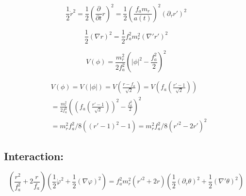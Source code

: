 \documentclass[a4paper]{article}
\begin{document}
\begin{equation}
    \frac{1}{2} \dot{r}^2 = \frac{1}{2} (\frac{\partial}{\partial t} r)^2
    = \frac{1}{2} (\frac{f_a m_r}{a(t)})^2 \left( \partial_\tau r' \right)^2
\end{equation}

\begin{equation}
    \frac{1}{2} (\nabla r)^2 = \frac{1}{2} f_a^2 m_r^2 ( \nabla' r')^2
\end{equation}

\begin{equation}
    V(\phi) = \frac{m_r^2}{2 f_a^2}\left( |\phi|^2 - \frac{f_a^2}{2} \right)^2
\end{equation}

\begin{align}
    &V(\phi) = V(|\phi|) = V(\frac{r - f_a}{\sqrt{2}})
    = V \left(f_a \left( \frac{r' - 1}{\sqrt{2}} \right) \right) \\
    &= \frac{m_r^2}{2 f_a^2}\left( \left(f_a \left( \frac{r' - 1}{\sqrt{2}} \right) \right)^2 - \frac{f_a^2}{2} \right)^2 \\
    &= m_r^2 f_a^2 / 8 ( (r' - 1)^2 - 1)
    = m_r^2 f_a^2 / 8 ( r'^2 - 2 r' )^2
\end{align}

\subsection{Interaction:}
\begin{equation}
\left( \frac{r^2}{f_a^2} + 2 \frac{r}{f_a} \right) \left( \frac{1}{2} \dot{\varphi}^2 + \frac{1}{2} (\nabla \varphi)^2 \right)
= f_a^2 m_r^2 (r'^2 + 2 r) \left( \frac{1}{2} (\partial_\tau \theta )^2 + \frac{1}{2} (\nabla' \theta)^2 \right)
\end{equation}

\newpage
\printbibliography
\end{document}
